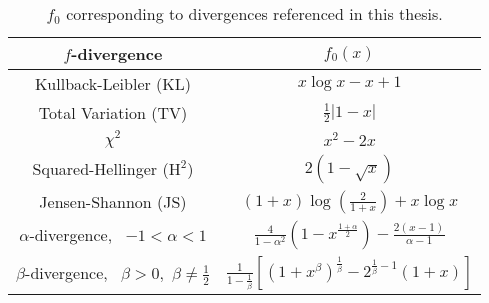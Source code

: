 %








{
\renewcommand{\arraystretch}{2}
\begin{table}
 \caption{$f_0$ corresponding to divergences referenced in this thesis.}
 \label{table:f-fns}
 \centering
 \begin{tabular}{c c} 
 \toprule
 $f$-divergence & $f_0(x)$ \\
 \midrule
 Kullback-Leibler (KL) & $x \log x - x + 1$\\
 Total Variation (TV) & $\frac{1}{2}|1-x|$\\
 $\chi^2$ & $x^2 - 2x$\\
 Squared-Hellinger ($\text{H}^2$) & $2(1-\sqrt{x})$\\
 Jensen-Shannon (JS) & $(1+x)\log(\frac{2}{1+x}) + x\log x$\\
 $\alpha$-divergence, \,
 $-1<\alpha < 1$ & $\frac{4}{1-\alpha^2}\left( 1 - x^{\frac{1+\alpha}{2}} \right) - \frac{2(x-1)}{\alpha-1}$ \\
 $\beta$-divergence, \,
 $\beta > 0,$ $\beta\not=\frac{1}{2}$ & $\frac{1}{1-\frac{1}{\beta}}\left[ (1+x^\beta)^{\frac{1}{\beta}} - 2^{\frac{1}{\beta}-1}(1+x) \right]$\\
 \bottomrule
\end{tabular}
\end{table}
}


